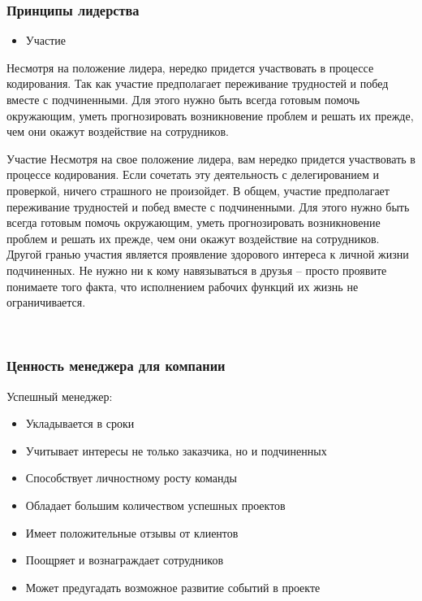 \documentclass{../industrial-development}
\begin{document}
\begin{frame} \frametitle{Принципы лидерства}
 \begin{block}{}
\begin{itemize}
  \item Участие
  \end{itemize}
 \end{block}
Несмотря на положение лидера,  нередко придется участвовать в процессе кодирования. Так как участие предполагает переживание трудностей и побед вместе с подчиненными. Для этого нужно быть всегда готовым помочь окружающим, уметь прогнозировать возникновение проблем и решать их прежде, чем они окажут воздействие на сотрудников.
\end{frame}
\lecturenotes
Участие
Несмотря на свое положение лидера, вам нередко придется участвовать в процессе кодирования. Если сочетать эту деятельность с делегированием и проверкой, ничего страшного не произойдет.
В общем, участие предполагает переживание трудностей и побед вместе с подчиненными. Для этого нужно быть всегда готовым помочь окружающим, уметь прогнозировать возникновение проблем и решать их прежде, чем они окажут воздействие на сотрудников. Другой гранью участия является проявление здорового интереса к личной жизни подчиненных. Не нужно ни к кому навязываться в друзья – просто проявите понимаете того факта, что исполнением рабочих функций их жизнь не ограничивается.

~\cite{How_to_be_a_good_IT-manager}

\begin{frame} \frametitle{Ценность менеджера для компании}
 \begin{block}{Успешный менеджер:}
\begin{itemize}
  \item Укладывается в сроки
  \item Учитывает интересы не только заказчика, но и подчиненных 
  \item Способствует личностному росту команды
  \item Обладает большим количеством успешных проектов
  \item Имеет положительные отзывы от клиентов
  \item Поощряет и вознаграждает сотрудников
  \item Может предугадать возможное развитие событий в проекте

  \end{itemize}
 \end{block}
\end{frame}
\lecturenotes
\end{document}
